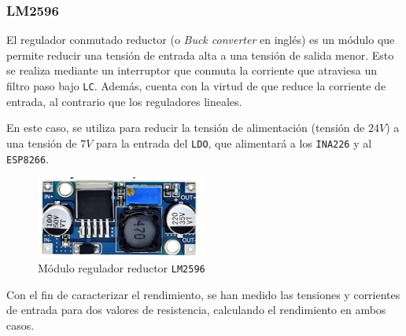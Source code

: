 \subsubsection{LM2596}

El regulador conmutado reductor (o \textit{Buck converter} en inglés) es un módulo que permite reducir una tensión de entrada alta a una tensión de salida menor. Esto se realiza mediante un interruptor que conmuta la corriente que atraviesa un filtro paso bajo \texttt{LC}. Además, cuenta con la virtud de que reduce la corriente de entrada, al contrario que los reguladores lineales. \cite{texasinstrumentsLM2596SIMPLESWITCHER}

En este caso, se utiliza para reducir la tensión de alimentación (tensión de $24 V$) a una tensión de $7 V$ para la entrada del \texttt{LDO}, que alimentará a los \texttt{INA226} y al \texttt{ESP8266}.

\begin{figure}[H]
    \centering
    \includegraphics[width=0.5\textwidth]{images/2-hardware/componentes/LM2596.png}
    \caption{Módulo regulador reductor \texttt{LM2596}}
    \label{fig:hardware/modulos/lm2596}
\end{figure}

Con el fin de caracterizar el rendimiento, se han medido las tensiones y corrientes de entrada para dos valores de resistencia, calculando el rendimiento en ambos casos.

